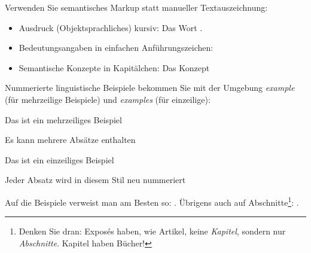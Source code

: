 \documentclass[naustrian]{univie-ling-expose}
\begin{document}
Verwenden Sie semantisches Markup statt manueller Textauszeichnung:
\begin{itemize}
	\item Ausdruck (Objektsprachliches) kursiv: Das Wort .
	\item Bedeutungsangaben in einfachen Anführungszeichen: 
	\item Semantische Konzepte in Kapitälchen: Das Konzept 
\end{itemize}
%
Nummerierte linguistische Beispiele bekommen Sie mit der Umgebung \emph{example} (für mehrzeilige Beispiele) und \emph{examples} (für einzeilige):

\begin{example}
	Das ist ein mehrzeiliges Beispiel
	
	Es kann mehrere Absätze enthalten
\end{example}

\begin{examples}
	\item Das ist ein einzeiliges Beispiel\label{exa:Beispiel-einzeilig}
	\item Jeder Absatz wird in diesem Stil neu nummeriert
\end{examples}
%
Auf die Beispiele verweist man am Besten so: . Übrigens auch auf Abschnitte\footnote{Denken Sie dran: Exposés haben, wie Artikel, keine \emph{Kapitel}, sondern nur \emph{Abschnitte}. Kapitel haben Bücher!}: .

\printbibliography[heading=bibnumbered]
\end{document}
